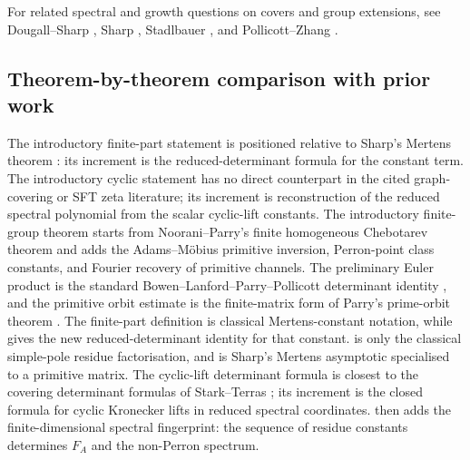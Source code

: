 For related spectral and growth questions on covers and group
extensions, see Dougall--Sharp \cite{DougallSharp2021AnosovCovers},
Sharp \cite{Sharp2020AmenableGroupExtensions}, Stadlbauer
\cite{Stadlbauer2013KestenAmenability,Stadlbauer2019ConformalMeasures},
and Pollicott--Zhang \cite{PollicottZhang2025RapidMixing}.

\subsection{Theorem-by-theorem comparison with prior work}

The introductory finite-part statement
 is positioned relative to Sharp's
Mertens theorem \cite{Sharp1991Mertens}: its increment is the
reduced-determinant formula for the constant term. The introductory
cyclic statement  has no direct
counterpart in the cited graph-covering or SFT zeta literature; its
increment is reconstruction of the reduced spectral polynomial from the
scalar cyclic-lift constants. The introductory finite-group theorem
 starts from Noorani--Parry's finite
homogeneous Chebotarev theorem \cite{NooraniParry1992ChebotarevShifts}
and adds the Adams--M\"obius primitive inversion, Perron-point class
constants, and Fourier recovery of primitive channels. The preliminary
Euler product  is the standard
Bowen--Lanford--Parry--Pollicott determinant identity
\cite{BowenLanford1970Zeta,ParryPollicott1990Zeta}, and the primitive
orbit estimate  is the finite-matrix
form of Parry's prime-orbit theorem \cite{Parry1983PrimeOrbit}. The
finite-part definition  is classical
Mertens-constant notation, while
 gives the new
reduced-determinant identity for that constant.
 is only the
classical simple-pole residue factorisation, and
 is Sharp's Mertens asymptotic
specialised to a primitive matrix. The cyclic-lift determinant formula
 is closest
to the covering determinant formulas of Stark--Terras
\cite{StarkTerras1996ZetaGraphCoverings}; its increment is the closed
formula for cyclic Kronecker lifts in reduced spectral coordinates.
 then adds
the finite-dimensional spectral fingerprint: the sequence of residue
constants determines \(F_A\) and the non-Perron spectrum.

